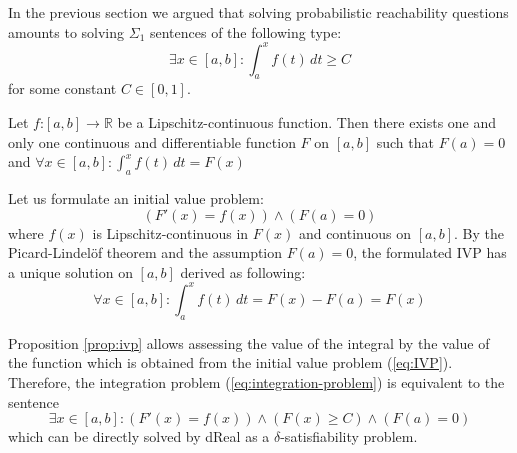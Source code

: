 In the previous section we argued that solving probabilistic reachability 
questions amounts to solving $\Sigma_1$ sentences of the following type:
\begin{equation} \label{eq:integration-problem}
\exists x \in [a, b] : \int_{a}^{x} f(t)\, dt \ge C
\end{equation}
for some constant $C\in [0,1]$.

\begin{proposition} \label{prop:ivp}
Let $f\mathord{:}[a,b] \rightarrow \mathbb{R}$ be a Lipschitz-continuous function. Then there 
exists one and only one continuous and differentiable function $F$ on $[a, b]$ 
such that $F(a) = 0$ and $\forall x \in [a, b]: \int_a^x f(t)\, dt = F(x)$
\end{proposition}

\begin{IEEEproof}
Let us formulate an initial value problem:
\begin{equation} \label{eq:IVP}
(F'(x) = f(x)) \wedge (F(a) = 0)
\end{equation}
where $f(x)$ is Lipschitz-continuous in $F(x)$ and continuous on $[a,b]$. 
By the Picard-Lindel\"{o}f theorem and the assumption $F(a)=0$, the formulated IVP 
has a unique solution on $[a, b]$ derived as following:
\begin{equation*} 
\forall x \in [a,b]: \int_a^x f(t)\, dt = F(x) - F(a) = F(x)
\end{equation*}
\end{IEEEproof}

Proposition \ref{prop:ivp} allows assessing the value of the integral by the value of the 
function which is obtained from the initial value problem (\ref{eq:IVP}). Therefore, 
the integration problem (\ref{eq:integration-problem}) is equivalent to the sentence
\begin{equation*} %
\exists x \in [a, b] : (F'(x) = f(x)) \wedge (F(x) \ge C) \wedge (F(a) = 0)
\end{equation*}
which can be directly solved by dReal as a $\delta$-satisfiability problem.

